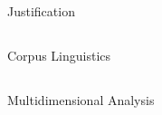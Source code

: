 Justification
\subsection{\citet{bardi_learning_2015}}
\subsection{\citet{baumvol_scholarly_2021}}
\subsection{\citet{belcher_seeking_2007}}
\subsection{\citet{cargill_introduction_2008}}
\subsection{\citet{hyland_scholarly_2025}}
\subsection{\citet{kaplan_cultural_1966}}
\subsection{\citet{severino_doodles_1993}}
\subsection{\citet{monteiro_periphery_2020}}
\subsection{\citet{ventura_desafiando_2024}}

Corpus Linguistics
\subsection{\citet{berber_sardinha_deus_2023}}

Multidimensional Analysis
\subsection{\citet{biber_variation_1988}}
\subsection{\citet{berber_sardinha_multi-dimensional_2019}}
